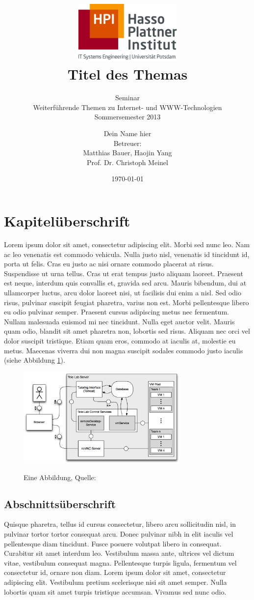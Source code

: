 \documentclass[a4paper,12pt,pagesize,headsepline,bibtotoc,titlepage]{scrartcl}
\title{
	\includegraphics*[width=0.4\textwidth]{hpi_logo.png}\\
	\vspace{24pt}
	Titel des Themas
}
\subtitle{
	Seminar\\
	Weiterführende Themen zu Internet- und WWW-Technologien\\
	Sommersemester 2013
}
\author{
	Dein Name hier\\[12pt]
	Betreuer:\\
	Matthias Bauer, Haojin Yang\\
	Prof. Dr. Christoph Meinel
}
\date{\today}
\begin{document}
\maketitle
\tableofcontents
\newpage


\section{Kapitelüberschrift}
Lorem ipsum dolor sit amet, consectetur adipiscing elit. Morbi sed nunc leo. Nam ac leo venenatis est commodo vehicula. Nulla justo nisl, venenatis id tincidunt id, porta ut felis. Cras eu justo ac nisi ornare commodo placerat at risus. Suspendisse ut urna tellus. Cras ut erat tempus justo aliquam laoreet. Praesent est neque, interdum quis convallis et, gravida sed arcu. Mauris bibendum, dui at ullamcorper luctus, arcu dolor laoreet nisi, ut facilisis dui enim a nisl. Sed odio risus, pulvinar suscipit feugiat pharetra, varius non est. Morbi pellentesque libero eu odio pulvinar semper. Praesent cursus adipiscing metus nec fermentum. Nullam malesuada euismod mi nec tincidunt. Nulla eget auctor velit. Mauris quam odio, blandit sit amet pharetra non, lobortis sed risus. Aliquam nec orci vel dolor suscipit tristique. Etiam quam eros, commodo at iaculis at, molestie eu metus. Maecenas viverra dui non magna suscipit sodales commodo justo iaculis (siehe Abbildung \ref{abb:test}).

\begin{figure}[hbp]
\begin{center}
\includegraphics*[width=0.75\textwidth]{beispiel.png}\\
\caption{Eine Abbildung, Quelle: \cite{willems2008}}
\label{abb:test}
\end{center}
\end{figure}

\subsection{Abschnittsüberschrift}
Quisque pharetra, tellus id cursus consectetur, libero arcu sollicitudin nisl, in pulvinar tortor tortor consequat arcu. Donec pulvinar nibh in elit iaculis vel pellentesque diam tincidunt. Fusce posuere volutpat libero in consequat. Curabitur sit amet interdum leo. Vestibulum massa ante, ultrices vel dictum vitae, vestibulum consequat magna. Pellentesque turpis ligula, fermentum vel consectetur id, ornare non diam. Lorem ipsum dolor sit amet, consectetur adipiscing elit. Vestibulum pretium scelerisque nisi sit amet semper. Nulla lobortis quam sit amet turpis tristique accumsan. Vivamus sed nunc odio.
\end{document}
